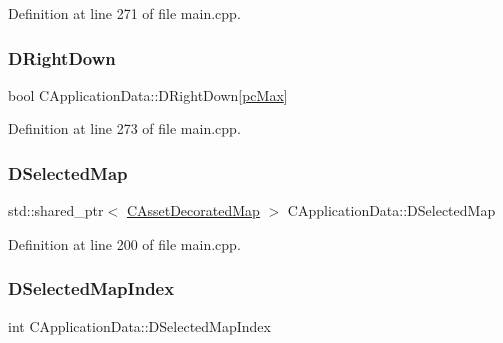 Definition at line 271 of file main.\+cpp.

\hypertarget{classCApplicationData_a0eb2ef18b6e71e98517f8b813a658164}{}\label{classCApplicationData_a0eb2ef18b6e71e98517f8b813a658164} 
\subsubsection{\texorpdfstring{D\+Right\+Down}{DRightDown}}
{\footnotesize\ttfamily bool C\+Application\+Data\+::\+D\+Right\+Down\mbox{[}\hyperlink{GameDataTypes_8h_aafb0ca75933357ff28a6d7efbdd7602fa594a5c8dd3987f24e8a0f23f1a72cd34}{pc\+Max}\mbox{]}\hspace{0.3cm}{\ttfamily [protected]}}



Definition at line 273 of file main.\+cpp.

\hypertarget{classCApplicationData_abf74a18394e479b7090a8f9a55608867}{}\label{classCApplicationData_abf74a18394e479b7090a8f9a55608867} 
\subsubsection{\texorpdfstring{D\+Selected\+Map}{DSelectedMap}}
{\footnotesize\ttfamily std\+::shared\+\_\+ptr$<$ \hyperlink{classCAssetDecoratedMap}{C\+Asset\+Decorated\+Map} $>$ C\+Application\+Data\+::\+D\+Selected\+Map\hspace{0.3cm}{\ttfamily [protected]}}



Definition at line 200 of file main.\+cpp.

\hypertarget{classCApplicationData_a279cfd90004e3f1b90b119358ff25586}{}\label{classCApplicationData_a279cfd90004e3f1b90b119358ff25586} 
\subsubsection{\texorpdfstring{D\+Selected\+Map\+Index}{DSelectedMapIndex}}
{\footnotesize\ttfamily int C\+Application\+Data\+::\+D\+Selected\+Map\+Index\hspace{0.3cm}{\ttfamily [protected]}}



